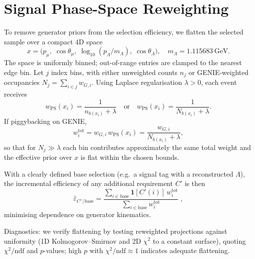 \section{Signal Phase-Space Reweighting}

To remove generator priors from the selection efficiency, we flatten the selected sample over a compact 4D space
\[
x=\bigl(p_\mu,\;\cos\theta_\mu,\;\log_{10}(p_\Lambda/m_\Lambda),\;\cos\theta_\Lambda\bigr),
\quad m_\Lambda=1.115683~\text{GeV}.
\]
The space is uniformly binned; out-of-range entries are clamped to the nearest edge bin. Let $j$ index bins, with either unweighted counts $n_j$ or GENIE-weighted occupancies $N_j=\sum_{i\in j}w_{G,i}$. Using Laplace regularisation $\lambda>0$, each event receives
\[
w_{\text{PS}}(x_i)=\frac{1}{n_{b(x_i)}+\lambda}
\quad\text{or}\quad
w_{\text{PS}}(x_i)=\frac{1}{N_{b(x_i)}+\lambda}.
\]
If piggybacking on GENIE,
\[
w_i^{\text{tot}}=w_{G,i}\,w_{\text{PS}}(x_i)=\frac{w_{G,i}}{N_{b(x_i)}+\lambda},
\]
so that for $N_j\gg\lambda$ each bin contributes approximately the same total weight and the effective prior over $x$ is flat within the chosen bounds.

With a clearly defined base selection (e.g.\ a signal tag with a reconstructed $\Lambda$), the incremental efficiency of any additional requirement $C'$ is then
\[
\widehat{\varepsilon}_{C'\,|\,\text{base}}
=\frac{\sum_{i\in\text{base}}\mathbf{1}[C'(i)]\,w_i^{\text{tot}}}
{\sum_{i\in\text{base}}w_i^{\text{tot}}}\;,
\]
minimising dependence on generator kinematics.

Diagnostics: we verify flattening by testing reweighted projections against uniformity (1D Kolmogorov--Smirnov and 2D $\chi^2$ to a constant surface), quoting $\chi^2/\text{ndf}$ and $p$-values; high $p$ with $\chi^2/\text{ndf}\!\approx\!1$ indicates adequate flattening.
